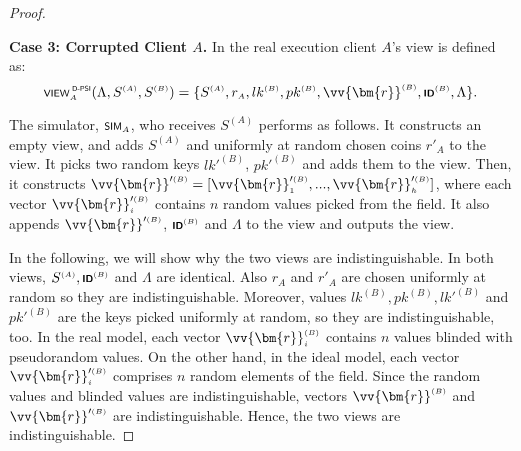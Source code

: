 \begin{proof}
\
\vspace{-2mm}

\noindent\textbf{Case 3: Corrupted Client $A$.} In the real execution client $A$'s view is defined as: 
\begin{equation*}
 \textsf {\scriptsize VIEW}^{\scriptscriptstyle\textsf { D-PSI}}_{\scriptscriptstyle A}(\Lambda, S^{\scriptscriptstyle (A)},S^{\scriptscriptstyle (B)})=\{S^{\scriptscriptstyle (A)}, r_{\scriptscriptstyle A}, lk^{\scriptscriptstyle (B)}, pk^{\scriptscriptstyle (B)}, \vv{\bm{r}}^{\scriptscriptstyle (B)},  \textsf {\scriptsize \textbf{ID}}^{\scriptscriptstyle  (B)}, \Lambda \}. 
\end{equation*}


The simulator, $\textsf {\scriptsize SIM}_{\scriptscriptstyle A}$, who receives $S^{\scriptscriptstyle (A)}$ performs as follows. It constructs an empty view, and adds $S^{\scriptscriptstyle (A)}$ and  uniformly at random chosen coins $r'_{\scriptscriptstyle A}$ to the view. It picks two random keys $lk'^{\scriptscriptstyle (B)}$, $pk'^{\scriptscriptstyle (B)}$ and  adds them to the view. Then, it constructs $\vv{\bm{r}}'^{\scriptscriptstyle (B)}=[\vv{\bm{r}}'^{\scriptscriptstyle (B)}_{\scriptscriptstyle 1}, ..., \vv{\bm{r}}'^{\scriptscriptstyle (B)}_{\scriptscriptstyle h}]$, where each vector $\vv{\bm{r}}'^{\scriptscriptstyle (B)}_{\scriptscriptstyle i}$ contains $n$ random values picked from the field. It also appends $\vv{\bm{r}}'^{\scriptscriptstyle (B)}$, $\textsf {\scriptsize \textbf{ID}}^{\scriptscriptstyle  (B)}$ and  $\Lambda$ to the view and outputs the view.

In the following, we will show why the two views are indistinguishable. In both views, $S^{\scriptscriptstyle (A)}, \textsf {\scriptsize \textbf{ID}}^{\scriptscriptstyle  (B)}$ and $\Lambda$ are identical.  Also $r_{\scriptscriptstyle A}$ and $r'_{\scriptscriptstyle A}$ are chosen uniformly at random so they are indistinguishable. Moreover,  values $lk^{\scriptscriptstyle (B)}, pk^{\scriptscriptstyle (B)}, lk'^{\scriptscriptstyle (B)}$ and $pk'^{\scriptscriptstyle (B)}$ are the keys picked uniformly at random, so they are indistinguishable, too. In the real model,  each vector $\vv{\bm{r}}^{\scriptscriptstyle (B)}_{\scriptscriptstyle i}$ contains $n$ values blinded with pseudorandom values. On the other hand, in the ideal model, each vector $\vv{\bm{r}}'^{\scriptscriptstyle (B)}_{\scriptscriptstyle i}$ comprises $n$ random elements of the field. Since the random values and blinded values are indistinguishable,  vectors $\vv{\bm{r}}^{\scriptscriptstyle (B)}$ and $\vv{\bm{r}}'^{\scriptscriptstyle (B)}$ are indistinguishable. Hence, the two views are indistinguishable. 
\end{proof}

\vspace{-3mm}